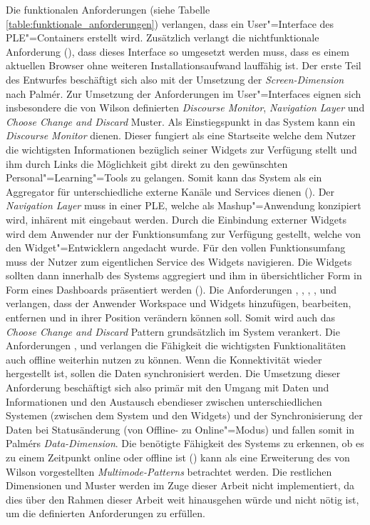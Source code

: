 Die funktionalen Anforderungen (siehe Tabelle \ref{table:funktionale_anforderungen}) verlangen, dass ein User"=Interface des PLE"=Containers erstellt wird. Zusätzlich verlangt die nichtfunktionale Anforderung (), dass dieses Interface so umgesetzt werden muss, dass es einem aktuellen Browser ohne weiteren Installationsaufwand lauffähig ist. Der erste Teil des Entwurfes beschäftigt sich also mit der Umsetzung der \emph{Screen-Dimension} nach Palmér. Zur Umsetzung der Anforderungen im User"=Interfaces eignen sich insbesondere die von Wilson definierten \emph{Discourse Monitor}, \emph{Navigation Layer} und \emph{Choose Change and Discard} Muster. Als Einstiegspunkt in das System kann ein \emph{Discourse Monitor} dienen. Dieser fungiert als eine Startseite welche dem Nutzer die wichtigsten Informationen bezüglich seiner Widgets zur Verfügung stellt  und ihm durch Links die Möglichkeit gibt direkt zu den gewünschten Personal"=Learning"=Tools zu gelangen. Somit kann das System als ein Aggregator für unterschiedliche externe Kanäle und Services dienen (). Der \emph{Navigation Layer} muss in einer PLE, welche als Mashup"=Anwendung konzipiert wird, inhärent mit eingebaut werden. Durch die Einbindung externer Widgets wird dem Anwender nur der Funktionsumfang zur Verfügung gestellt, welche von den Widget"=Entwicklern angedacht wurde. Für den vollen Funktionsumfang muss der Nutzer zum eigentlichen Service des Widgets navigieren. Die Widgets sollten dann innerhalb des Systems aggregiert und ihm in übersichtlicher Form in Form eines Dashboards präsentiert werden (). Die Anforderungen , , , ,  und  verlangen, dass der Anwender Workspace und Widgets hinzufügen, bearbeiten, entfernen und in ihrer Position verändern können soll. Somit wird auch das \emph{Choose Change and Discard} Pattern grundsätzlich im System verankert. Die Anforderungen ,  und  verlangen die Fähigkeit die wichtigsten Funktionalitäten auch offline weiterhin nutzen zu können. Wenn die Konnektivität wieder hergestellt ist, sollen die Daten synchronisiert werden. Die Umsetzung dieser Anforderung beschäftigt sich also primär mit den Umgang mit Daten und Informationen und den Austausch ebendieser zwischen unterschiedlichen Systemen (zwischen dem System und den Widgets) und der Synchronisierung der Daten bei Statusänderung (von Offline- zu Online"=Modus) und fallen somit in Palmérs \emph{Data-Dimension}. Die benötigte Fähigkeit des Systems zu erkennen, ob es zu einem Zeitpunkt online oder offline ist () kann als eine Erweiterung des von Wilson vorgestellten \emph{Multimode-Patterns} betrachtet werden.   
Die restlichen Dimensionen und Muster werden im Zuge dieser Arbeit nicht implementiert, da dies über den Rahmen dieser Arbeit weit hinausgehen würde und nicht nötig ist, um die definierten Anforderungen zu erfüllen.

